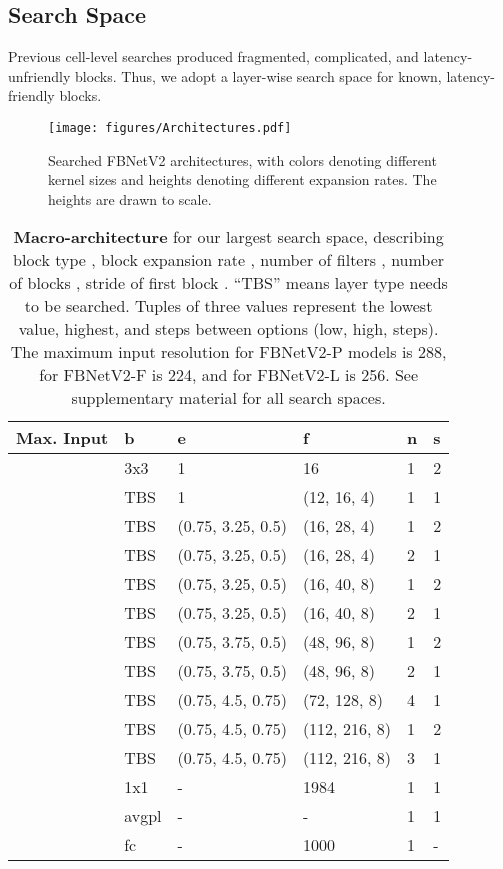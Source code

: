 \documentclass[10pt,twocolumn,letterpaper]{article}
\begin{document}
\subsection{Search Space}
Previous cell-level searches produced fragmented, complicated, and latency-unfriendly blocks. Thus, we adopt a layer-wise search space for known, latency-friendly blocks. 

\begin{figure}
    \centering
    \texttt{[image: figures/Architectures.pdf]}
    \caption{Searched FBNetV2 architectures, with colors denoting different kernel sizes and heights denoting different expansion rates. The heights are drawn to scale.}
    \label{fig:architectures}
\end{figure}

\begin{table}[h]
\footnotesize
\centering
\caption{\textbf{Macro-architecture} for our largest search space, describing block type , block expansion rate , number of filters , number of blocks , stride of first block . ``TBS'' means layer type needs to be searched. Tuples of three values represent the lowest value, highest, and steps between options (low, high, steps). The maximum input resolution for FBNetV2-P models is 288, for FBNetV2-F is 224, and for FBNetV2-L is 256. See supplementary material for all search spaces. }



\begin{tabular*}{0.48\textwidth}{l @{\extracolsep{\fill}} lllll}
\toprule
Max. Input              & b           & e         & f          & n        & s \\ \midrule
          & 3x3         & 1         & 16         & 1        & 2 \\

 	 & TBS 	 & 1 	 & (12, 16, 4) 	 & 1 	 & 1 \\
 	 & TBS 	 & (0.75, 3.25, 0.5) 	 & (16, 28, 4) 	 & 1 	 & 2 \\
 	 & TBS 	 & (0.75, 3.25, 0.5) 	 & (16, 28, 4) 	 & 2 	 & 1 \\
 	 & TBS 	 & (0.75, 3.25, 0.5) 	 & (16, 40, 8) 	 & 1 	 & 2 \\
 	 & TBS 	 & (0.75, 3.25, 0.5) 	 & (16, 40, 8) 	 & 2 	 & 1 \\
 	 & TBS 	 & (0.75, 3.75, 0.5) 	 & (48, 96, 8) 	 & 1 	 & 2 \\
 	 & TBS 	 & (0.75, 3.75, 0.5) 	 & (48, 96, 8) 	 & 2 	 & 1 \\
 	 & TBS 	 & (0.75, 4.5, 0.75) 	 & (72, 128, 8) 	 & 4 	 & 1 \\
 	 & TBS 	 & (0.75, 4.5, 0.75) 	 & (112, 216, 8) 	 & 1 	 & 2 \\
 	 & TBS 	 & (0.75, 4.5, 0.75) 	 & (112, 216, 8) 	 & 3 	 & 1 \\
        & 1x1         & -         & 1984       & 1        & 1           \\
       & avgpl     & -         & -          & 1        & 1           \\
                  & fc          & -         & 1000       & 1        & -      \\ \bottomrule
\end{tabular*}


\end{table}
\end{document}
